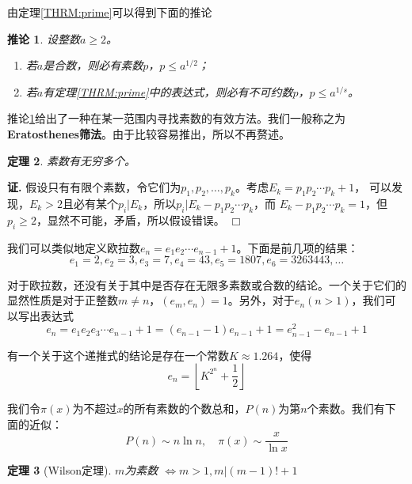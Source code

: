 \documentclass{ctexrep}
\newcommand{\bbold}[1]{\textbf{#1}}
\newtheorem{thrm}{定理}[section]
\newtheorem{coro}[thrm]{推论}
\renewenvironment{proof}[1][证]{\noindent \textbf{#1.} }{\hfill$\Box$}
\begin{document}
由定理\ref{THRM:prime}可以得到下面的推论
\begin{coro}\label{coro:erato}
设整数$a\geq 2$。
\begin{enumerate}
\item 若$a$是合数，则必有素数$p$，$p \leq a^{1/2}$；
\item 若$a$有定理\ref{THRM:prime}中的表达式，则必有不可约数$p$，$p \leq a^{1/s}$。
\end{enumerate}
\end{coro}

推论\ref{coro:erato}给出了一种在某一范围内寻找素数的有效方法。我们一般称之为\bbold{Eratosthenes筛法}。由于比较容易推出，所以不再赘述。

\begin{thrm}
素数有无穷多个。
\end{thrm}
\begin{proof}
假设只有有限个素数，令它们为$p_1,p_2,\dotsc,p_k$。考虑$E_k=p_1 p_2 \dotsm p_k +1$，
可以发现，$E_k>2$且必有某个$p_i | E_k$，所以$p_i | E_k - p_1 p_2 \dotsm p_k$，而
$E_k - p_1 p_2 \dotsm p_k=1$，但$p_i \geq 2$，显然不可能，矛盾，所以假设错误。
\end{proof}

我们可以类似地定义欧拉数$e_n=e_1e_2\dotsm e_{n-1}+1$。下面是前几项的结果：
\begin{displaymath}
e_1=2, e_2=3, e_3=7, e_4=43, e_5=1807, e_6=3263443,\dotsc
\end{displaymath}

对于欧拉数，还没有关于其中是否存在无限多素数或合数的结论。一个关于它们的显然性质是对于正整数$m\neq n$，$(e_m,e_n)=1$。另外，对于$e_n(n>1)$，我们可以写出表达式
\begin{displaymath}
e_n=e_1e_2e_3\dotsm e_{n-1}+1=(e_{n-1}-1)e_{n-1}+1=e_{n-1}^2-e_{n-1}+1
\end{displaymath}

有一个关于这个递推式的结论是存在一个常数$K\approx 1.264$，使得
\begin{displaymath}
e_n=\left\lfloor K^{2^n}+\frac{1}{2} \right\rfloor
\end{displaymath}

我们令$\pi(x)$为不超过$x$的所有素数的个数总和，$P(n)$为第$n$个素数。我们有下面的近似：
\begin{displaymath}
P(n)\sim n\ln n,\quad \pi(x)\sim \frac{x}{\ln x}
\end{displaymath}

\begin{thrm}[Wilson定理]
$m$为素数 $\iff m>1, m|(m-1)!+1$
\end{thrm}
\end{document}

